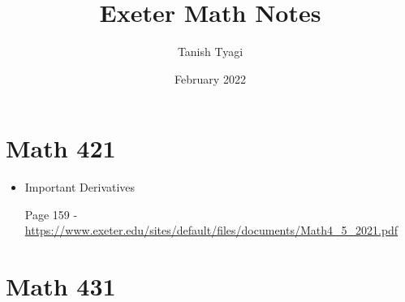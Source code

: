\documentclass{article}
\title{Exeter Math Notes}
\author{Tanish Tyagi}
\date{February 2022}
\begin{document}
\maketitle

\section{Math 421}

\begin{itemize}
    \item Important Derivatives
    
     Page 159 - \url{https://www.exeter.edu/sites/default/files/documents/Math4_5_2021.pdf}
\end{itemize}

\section{Math 431}
\end{document}
